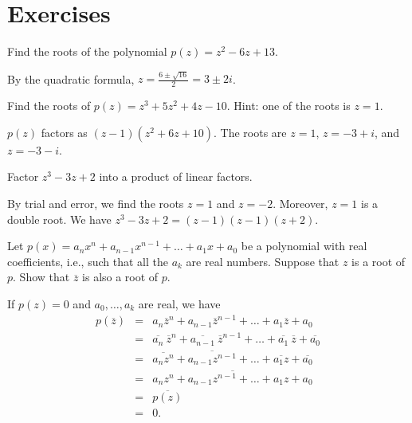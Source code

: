 \section*{Exercises}


\begin{ex}
  Find the roots of the polynomial $p(z) = z^2-6z+13$.
  \begin{sol}
    By the quadratic formula, $\displaystyle z=\frac{6\pm\sqrt{16}}{2}
      = 3\pm 2i$.
  \end{sol}
\end{ex}

\begin{ex}
  Find the roots of $p(z) = z^3 + 5z^2 + 4z - 10$. Hint: one of the
  roots is $z=1$.
  \begin{sol}
    $p(z)$ factors as $(z-1)(z^2+6z+10)$. The roots are $z=1$,
    $z=-3+i$, and $z=-3-i$.
  \end{sol}
\end{ex}

\begin{ex}
  Factor $z^3 - 3z + 2$ into a product of linear factors.
  \begin{sol}
    By trial and error, we find the roots $z=1$ and $z=-2$. Moreover,
    $z=1$ is a double root. We have $z^3 - 3z + 2 = (z-1)(z-1)(z+2)$.
  \end{sol}
\end{ex}

\begin{ex}
  Let $p(x) =a_{n}x^{n}+a_{n-1}x^{n-1}+\ldots+a_{1}x+a_{0}$ be a
  polynomial with real coefficients, i.e., such that all the $a_{k}$
  are real numbers. Suppose that $z$ is a root of $p$. Show that
  $\overline{z}$ is also a root of $p$.
  \begin{sol}
    If $p(z) =0$ and $a_0,\ldots,a_k$ are real, we have
    \begin{eqnarray*}
      p(\overline{z})
      &=& a_{n}\overline{z}^{n}+a_{n-1}\overline{z}^{n-1}+\ldots +a_{1}\overline{z}
          +a_{0} \\
      &=&\overline{a_{n}}\ \overline{z}^{n}+\overline{a_{n-1}}\ \overline{z}
      ^{n-1}+\ldots +\overline{a_{1}}\ \overline{z}+\overline{a_{0}}
      \\
      &=& \overline{a_{n}z^{n}}+\overline{a_{n-1}z^{n-1}}+\ldots +\overline{a_{1}z}+
          \overline{a_{0}} \\
      &=& \overline{a_{n}z^{n}+a_{n-1}z^{n-1}+\ldots+a_{1}z+a_{0}} \\
      &=& \overline{p(z) } \\
      &=& 0.
    \end{eqnarray*}
  \end{sol}
\end{ex}

